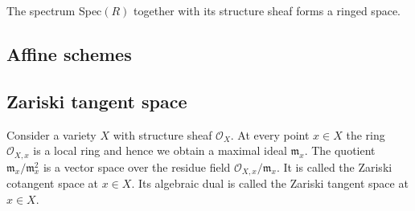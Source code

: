 	\begin{property}
		The spectrum Spec$(R)$ together with its structure sheaf forms a ringed space.
	\end{property}

\subsection{Affine schemes}

	
\subsection{Zariski tangent space}

	\begin{definition}
		Consider a variety $X$ with structure sheaf $\mathcal{O}_X$. At every point $x\in X$ the ring $\mathcal{O}_{X, x}$ is a local ring and hence we obtain a maximal ideal $\mathfrak{m}_x$. The quotient $\mathfrak{m}_x/\mathfrak{m}_x^2$ is a vector space over the residue field $\mathcal{O}_{X, x}/\mathfrak{m}_x$. It is called the Zariski cotangent space at $x\in X$. Its algebraic dual is called the Zariski tangent space at $x\in X$.
	\end{definition}
